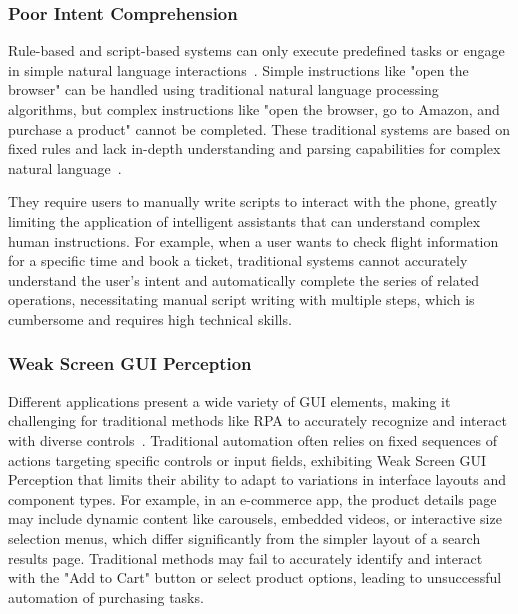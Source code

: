 \subsubsection{Poor Intent Comprehension}

Rule-based and script-based systems can only execute predefined tasks or engage in simple natural language interactions~\cite{kepuska2018next,cowan2017can}. Simple instructions like "open the browser" can be handled using traditional natural language processing algorithms, but complex instructions like "open the browser, go to Amazon, and purchase a product" cannot be completed. These traditional systems are based on fixed rules and lack in-depth understanding and parsing capabilities for complex natural language~\cite{anicic2010rule,kang2013using,karanikolas2023large}.

They require users to manually write scripts to interact with the phone, greatly limiting the application of intelligent assistants that can understand complex human instructions. For example, when a user wants to check flight information for a specific time and book a ticket, traditional systems cannot accurately understand the user's intent and automatically complete the series of related operations, necessitating manual script writing with multiple steps, which is cumbersome and requires high technical skills.

\subsubsection{Weak Screen GUI Perception}

Different applications present a wide variety of GUI elements, making it challenging for traditional methods like RPA to accurately recognize and interact with diverse controls~\cite{fu2024understanding,banerjee2013graphical,chen2018ui,brich2017exploring}. Traditional automation often relies on fixed sequences of actions targeting specific controls or input fields, exhibiting Weak Screen GUI Perception that limits their ability to adapt to variations in interface layouts and component types. For example, in an e-commerce app, the product details page may include dynamic content like carousels, embedded videos, or interactive size selection menus, which differ significantly from the simpler layout of a search results page. Traditional methods may fail to accurately identify and interact with the "Add to Cart" button or select product options, leading to unsuccessful automation of purchasing tasks.


